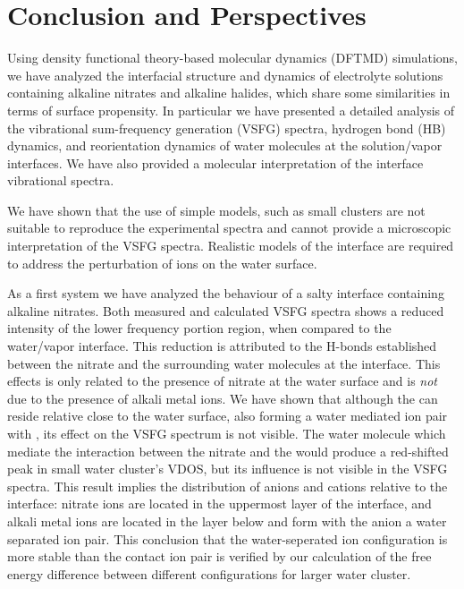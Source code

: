 \chapter{Conclusion and Perspectives}\label{CHAPTER_Summary}
Using density functional theory-based molecular dynamics (DFTMD) simulations, we have analyzed the interfacial structure and dynamics of electrolyte solutions containing alkaline nitrates and alkaline halides,
which share some similarities in terms of surface propensity.
In particular we have presented a detailed analysis of the vibrational sum-frequency generation (VSFG) spectra, hydrogen bond (HB) dynamics, and reorientation dynamics of water molecules at the solution/vapor interfaces. 
We have also provided a molecular interpretation of the interface vibrational spectra. 

We have shown that the use of simple models, such as small clusters are not suitable to reproduce the experimental spectra 
and cannot provide a microscopic interpretation of the VSFG spectra. Realistic models of the interface are required to address the 
perturbation of ions on the water surface. 

As a first system we have analyzed the behaviour of a salty interface containing alkaline nitrates.
Both measured and calculated VSFG spectra shows a reduced intensity of the lower frequency portion region, 
when compared to the water/vapor interface. 
This reduction is attributed to the H-bonds established between the nitrate and the surrounding water molecules at the interface.
This effects is only related to the presence of nitrate at the water surface and is \emph{not} due to the presence of alkali metal ions.
We have shown that although the \Li can reside relative close to the water surface, also forming a water mediated
ion pair with \nit, its effect on the VSFG spectrum is not visible. The water molecule which mediate the interaction 
between the nitrate and the \Li would produce a red-shifted peak in small water cluster's VDOS, but its influence is not visible 
in the VSFG spectra. This result implies the distribution of anions and cations relative to the interface: 
nitrate ions are located in the uppermost layer of the interface, and alkali metal ions are located in the layer below 
and form with the anion a water separated ion pair.
This conclusion that the water-seperated ion configuration is more stable than the contact ion pair is verified by our calculation of the free energy difference between different configurations for larger water cluster.

